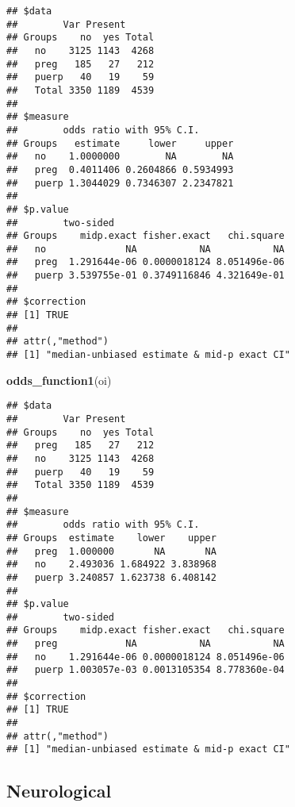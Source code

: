 \documentclass[
]{article}
\newenvironment{Shaded}{\begin{snugshade}}{\end{snugshade}}
\newcommand{\KeywordTok}[1]{\textcolor[rgb]{0.13,0.29,0.53}{\textbf{#1}}}
\newcommand{\NormalTok}[1]{#1}
\newcommand{\OperatorTok}[1]{\textcolor[rgb]{0.81,0.36,0.00}{\textbf{#1}}}
\newcommand{\StringTok}[1]{\textcolor[rgb]{0.31,0.60,0.02}{#1}}
\begin{document}
\begin{verbatim}
## $data
##        Var Present
## Groups    no  yes Total
##   no    3125 1143  4268
##   preg   185   27   212
##   puerp   40   19    59
##   Total 3350 1189  4539
## 
## $measure
##        odds ratio with 95% C.I.
## Groups   estimate     lower     upper
##   no    1.0000000        NA        NA
##   preg  0.4011406 0.2604866 0.5934993
##   puerp 1.3044029 0.7346307 2.2347821
## 
## $p.value
##        two-sided
## Groups    midp.exact fisher.exact   chi.square
##   no              NA           NA           NA
##   preg  1.291644e-06 0.0000018124 8.051496e-06
##   puerp 3.539755e-01 0.3749116846 4.321649e-01
## 
## $correction
## [1] TRUE
## 
## attr(,"method")
## [1] "median-unbiased estimate & mid-p exact CI"
\end{verbatim}

\begin{Shaded}
\begin{Highlighting}[]
\KeywordTok{odds_function1}\NormalTok{(oi)}
\end{Highlighting}
\end{Shaded}

\begin{verbatim}
## $data
##        Var Present
## Groups    no  yes Total
##   preg   185   27   212
##   no    3125 1143  4268
##   puerp   40   19    59
##   Total 3350 1189  4539
## 
## $measure
##        odds ratio with 95% C.I.
## Groups  estimate    lower    upper
##   preg  1.000000       NA       NA
##   no    2.493036 1.684922 3.838968
##   puerp 3.240857 1.623738 6.408142
## 
## $p.value
##        two-sided
## Groups    midp.exact fisher.exact   chi.square
##   preg            NA           NA           NA
##   no    1.291644e-06 0.0000018124 8.051496e-06
##   puerp 1.003057e-03 0.0013105354 8.778360e-04
## 
## $correction
## [1] TRUE
## 
## attr(,"method")
## [1] "median-unbiased estimate & mid-p exact CI"
\end{verbatim}

\hypertarget{neurological}{%
\subsection{Neurological}\label{neurological}}

\begin{Shaded}
\end{Shaded}
\end{document}
